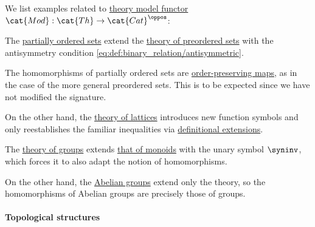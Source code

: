 \begin{example}\label{ex:def:fol_theory_model_functor}
  We list examples related to \hyperref[def:fol_theory_model_functor]{theory model functor} \( \cat{Mod}: \cat{Th} \to \cat{Cat}^\oppos \):
  \begin{thmenum}
     The \hyperref[def:partially_ordered_set/theory]{partially ordered sets} extend the \hyperref[def:partially_ordered_set/theory]{theory of preordered sets} with the antisymmetry condition \eqref{eq:def:binary_relation/antisymmetric}.

    The homomorphisms of partially ordered sets are \hyperref[def:order_function/preserving]{order-preserving maps}, as in the case of the more general preordered sets. This is to be expected since we have not modified the signature.

    On the other hand, the \hyperref[def:lattice/theory]{theory of lattices} introduces new function symbols and only reestablishes the familiar inequalities via \hyperref[def:fol_definitional_extension]{definitional extensions}.

     The \hyperref[def:group/theory]{theory of groups} extends \hyperref[def:monoid/theory]{that of monoids} with the unary symbol \( {\syninv} \), which forces it to also adapt the notion of homomorphisms.

    On the other hand, the \hyperref[def:abelian_group]{Abelian groups} extend only the theory, so the homomorphisms of Abelian groups are precisely those of groups.
  \end{thmenum}
\end{example}

\paragraph{Topological structures}

